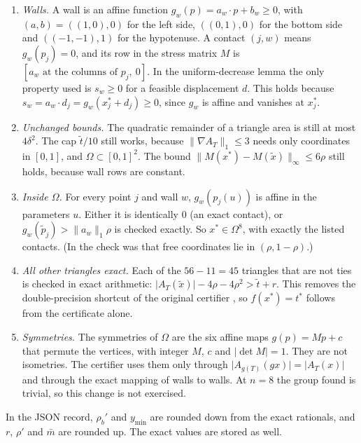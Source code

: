 \documentclass[11pt]{amsart}
\theoremstyle{definition}
\newcommand{\tstar}{t^{*}}
\newcommand{\Om}{\Omega}
\begin{document}
\begin{enumerate}[label=(L\arabic*)]
\item \emph{Walls.} A wall is an affine function $g_w(p) = a_w\cdot p + b_w \ge 0$, with $(a,b) = ((1,0),0)$ for the left side, $((0,1),0)$ for the bottom side and $((-1,-1),1)$ for the hypotenuse. A contact $(j,w)$ means $g_w(p_j) = 0$, and its row in the stress matrix $M$ is $[a_w \text{ at the columns of } p_j,\ 0]$. In the uniform-decrease lemma \cite[Lemma~B.3]{N9} the only property used is $s_w \ge 0$ for a feasible displacement $d$. This holds because $s_w = a_w\cdot d_j = g_w(x^*_j + d_j) \ge 0$, since $g_w$ is affine and vanishes at $x^*_j$. %
\item \emph{Unchanged bounds.} The quadratic remainder of a triangle area is still at most $4\delta^2$. The cap $\tilde t/10$ still works, because $\|\nabla A_T\|_1 \le 3$ needs only coordinates in $[0,1]$, and $\Om \subset [0,1]^2$. The bound $\|M(x^*) - M(\tilde x)\|_\infty \le 6\rho$ still holds, because wall rows are constant.
\item \emph{Inside $\Om$.} For every point $j$ and wall $w$, $g_w(p_j(u))$ is affine in the parameters $u$. Either it is identically $0$ (an exact contact), or $g_w(\tilde p_j) > \|a_w\|_1\rho$ is checked exactly. So $x^* \in \Om^8$, with exactly the listed contacts. (In \cite{N9} the check was that free coordinates lie in $(\rho, 1-\rho)$.)
\item \emph{All other triangles exact.} Each of the $56 - 11 = 45$ triangles that are not ties is checked in exact arithmetic: $\lvert A_T(\tilde x)\rvert - 4\rho - 4\rho^2 > \tilde t + r$. This removes the double-precision shortcut of the original certifier \cite[App.~B.7(ii)]{N9}, so $f(x^*) = \tstar$ follows from the certificate alone.
\item \emph{Symmetries.} The symmetries of $\Om$ are the six affine maps $g(p) = Mp + c$ that permute the vertices, with integer $M$, $c$ and $\lvert\det M\rvert = 1$. They are not isometries. The certifier uses them only through $\lvert A_{g(T)}(gx)\rvert = \lvert A_T(x)\rvert$ and through the exact mapping of walls to walls. At $n = 8$ the group found is trivial, so this change is not exercised.
\end{enumerate}
In the JSON record, $\rho_b'$ and $y_{\min}$ are rounded down from the exact rationals, and $r$, $\rho'$ and $\bar m$ are rounded up. The exact values are stored as well. %
\end{document}
